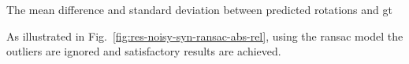 The mean difference and standard deviation between predicted rotations and
\gls{gt}


As illustrated in Fig.~\ref{fig:res-noisy-syn-ransac-abs-rel}, using the ransac
model the outliers are ignored and satisfactory results are achieved.











